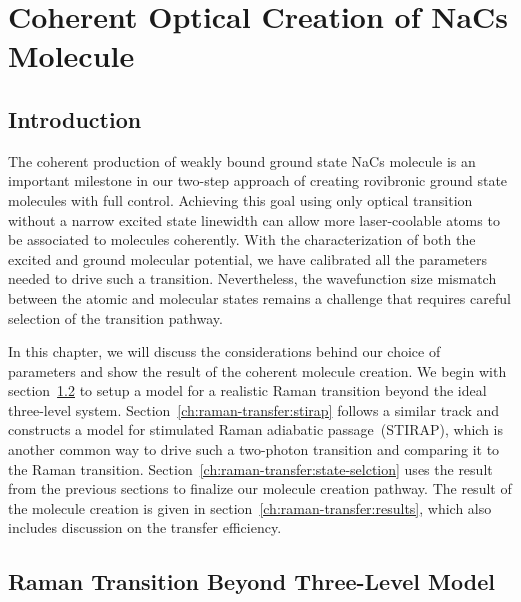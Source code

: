 
\chapter{Coherent Optical Creation of NaCs Molecule}
\label{ch:raman-transfer}

\section{Introduction}
\label{ch:raman-transfer:introduction}

The coherent production of weakly bound ground state NaCs molecule is an important milestone
in our two-step approach of creating rovibronic ground state molecules with full control.
Achieving this goal using only optical transition without a narrow excited state linewidth
can allow more laser-coolable atoms to be associated to molecules coherently.
With the characterization of both the excited and ground molecular potential,
we have calibrated all the parameters needed to drive such a transition.
Nevertheless, the wavefunction size mismatch between the atomic and molecular states
remains a challenge that requires careful selection of the transition pathway.

In this chapter, we will discuss the considerations behind our choice of parameters
and show the result of the coherent molecule creation.
We begin with section~\ref{ch:raman-transfer:raman} to setup a model
for a realistic Raman transition beyond the ideal three-level system.
Section~\ref{ch:raman-transfer:stirap} follows a similar track and constructs a model
for stimulated Raman adiabatic passage~(STIRAP),
which is another common way to drive such a two-photon transition
and comparing it to the Raman transition.
Section~\ref{ch:raman-transfer:state-selction} uses the result from the previous sections
to finalize our molecule creation pathway.
The result of the molecule creation is given in section~\ref{ch:raman-transfer:results},
which also includes discussion on the transfer efficiency.

\section{Raman Transition Beyond Three-Level Model}
\label{ch:raman-transfer:raman}

